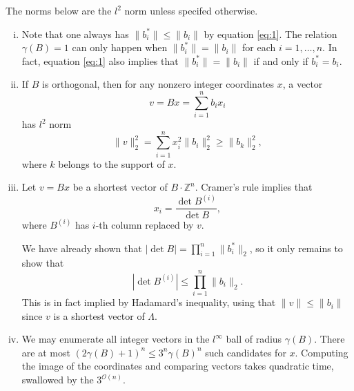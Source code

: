 \documentclass[12pt,a4paper]{article}
\theoremstyle{plain}
\theoremstyle{definition}
\def \Z {\mathbb Z}
\begin{document}
{
	The norms below are the $l^2$ norm unless specifed otherwise.

	\begin{enumerate}[i)]
		\item Note that one always has $\| b_i^* \| \leq \| b_i \|$ by equation \eqref{eq:1}.
		The relation $\gamma(B) = 1$ can only happen when $\| b_i^* \| = \| b_i \|$ for each $i=1, \dots, n$.
		In fact, equation \eqref{eq:1} also implies that $\| b_i^* \| = \| b_i \|$ if and only if $b_i^* = b_i$.

		\item If $B$ is orthogonal, then for any nonzero integer coordinates $x$, a vector
			\[ v = Bx = \sum_{i=1}^n b_i x_i \]
		has $l^2$ norm
			\[ \| v \|_2^2 = \sum_{i=1}^n x_i^2 \| b_i\|_2^2 \geq \| b_k \|_2^2, \]
		where $k$ belongs to the support of $x$.

		\item Let $v = Bx$ be a shortest vector of $B \cdot \Z^n$.
		Cramer's rule implies that
			\[ x_i = \frac{\det B^{(i)}}{\det B}, \]
		where $B^{(i)}$ has $i$-th column replaced by $v$.
		
		We have already shown that $|\det B| = \prod_{i=1}^n \| b_i^* \|_2$, so it only remains to show that
			\[ | \det B^{(i)} | \leq \prod_{i=1}^n  \| b_i \|_2. \]
		This is in fact implied by Hadamard's inequality, using that $\| v \| \leq \| b_i \|$ since $v$ is a shortest vector of $\Lambda$.

		\item We may enumerate all integer vectors in the $l^\infty$ ball of radius $\gamma(B)$. 
		There are at most $(2 \gamma(B) + 1)^n \leq 3^n \gamma(B)^n$ such candidates for $x$.
		Computing the image of the coordinates and comparing vectors takes quadratic time, swallowed by the $3^{\mathcal{O}(n)}$.
	\end{enumerate}


}
\end{document}
